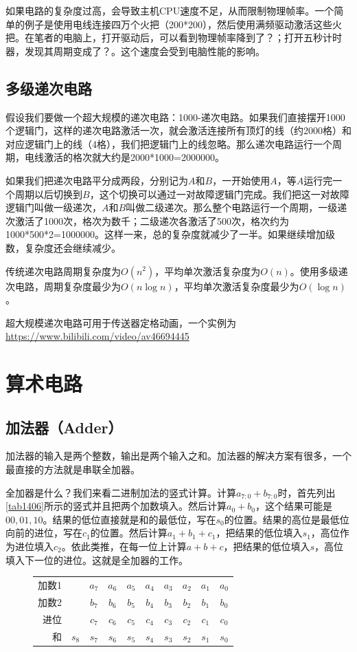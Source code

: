 如果电路的复杂度过高，会导致主机CPU速度不足，从而限制物理帧率。一个简单的例子是使用电线连接四万个火把（200*200），然后使用满频驱动激活这些火把。在笔者的电脑上，打开驱动后，可以看到物理帧率降到了？；打开五秒计时器，发现其周期变成了？。这个速度会受到电脑性能的影响。

\subsection{多级递次电路}
假设我们要做一个超大规模的递次电路：1000-递次电路。如果我们直接摆开1000个逻辑门，这样的递次电路激活一次，就会激活连接所有顶灯的线（约2000格）和对应逻辑门上的线（4格），我们把逻辑门上的线忽略。那么递次电路运行一个周期，电线激活的格次就大约是2000*1000=2000000。

如果我们把递次电路平分成两段，分别记为$A$和$B$，一开始使用$A$，等$A$运行完一个周期以后切换到$B$，这个切换可以通过一对故障逻辑门完成。我们把这一对故障逻辑门叫做一级递次，$A$和$B$叫做二级递次。那么整个电路运行一个周期，一级递次激活了1000次，格次为数千；二级递次各激活了500次，格次约为1000*500*2=1000000。这样一来，总的复杂度就减少了一半。如果继续增加级数，复杂度还会继续减少。

传统递次电路周期复杂度为$O(n^2)$，平均单次激活复杂度为$O(n)$。使用多级递次电路，周期复杂度最少为$O(n\log n)$，平均单次激活复杂度最少为$O(\log n)$。

超大规模递次电路可用于传送器定格动画，一个实例为\url{https://www.bilibili.com/video/av46694445}

\section{算术电路}

\subsection{加法器（Adder）}
加法器的输入是两个整数，输出是两个输入之和。加法器的解决方案有很多，一个最直接的方法就是串联全加器。

全加器是什么？我们来看二进制加法的竖式计算。计算$a_{7:0}+b_{7:0}$时，首先列出\autoref{tab1406}所示的竖式并且把两个加数填入。然后计算$a_0+b_0$，这个结果可能是$00,01,10$。结果的低位直接就是和的最低位，写在$s_0$的位置。结果的高位是最低位向前的进位，写在$c_1$的位置。然后计算$a_1+b_1+c_1$，把结果的低位填入$s_1$，高位作为进位填入$c_2$。依此类推，在每一位上计算$a+b+c$，把结果的低位填入$s$，高位填入下一位的进位。这就是全加器的工作。

\begin{figure}[!h]
\centering
\begin{tabular}{rccccccccc}
加数1&&$a_7$&$a_6$&$a_5$&$a_4$&$a_3$&$a_2$&$a_1$&$a_0$\\
加数2&&$b_7$&$b_6$&$b_5$&$b_4$&$b_3$&$b_2$&$b_1$&$b_0$\\
进位&&$c_7$&$c_6$&$c_5$&$c_4$&$c_3$&$c_2$&$c_1$&$c_0$\\\hline
和&$s_8$&$s_7$&$s_6$&$s_5$&$s_4$&$s_3$&$s_2$&$s_1$&$s_0$
\end{tabular}
\caption{}\label{tab1406}
\end{figure}

